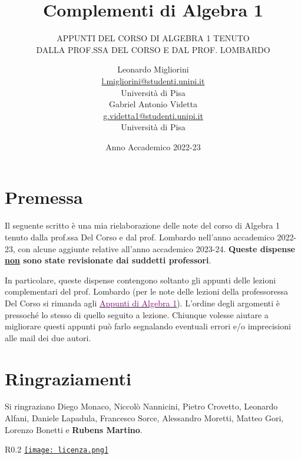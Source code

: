 \documentclass[11pt]{scrartcl}
\begin{document}
	\title{Complementi di Algebra 1}
	\subtitle{\large\normalfont\rmfamily\scshape APPUNTI DEL CORSO DI ALGEBRA 1 TENUTO\\ DALLA PROF.SSA DEL CORSO E DAL PROF. LOMBARDO}
	\author{Leonardo Migliorini \\ \textnormal{\href{l.migliorini@studenti.unipi.it}{l.migliorini@studenti.unipi.it}} \\ Università di Pisa \\[0.3in] Gabriel Antonio Videtta \\ \textnormal{\href{g.videtta1@studenti.unipi.it}{g.videtta1@studenti.unipi.it}} \\ Università di Pisa}
	\date{Anno Accademico 2022-23}
	\maketitle
	\newpage
	
	\tableofcontents
	
	\newpage
	
	\section*{Premessa}
	Il seguente scritto è una mia rielaborazione delle note del corso di Algebra 1 tenuto dalla prof.ssa Del Corso e dal prof. Lombardo nell'anno accademico 
	2022-23, con alcune aggiunte relative all'anno accademico 2023-24. \textbf{Queste dispense \underline{non} sono state revisionate dai suddetti professori}. \medskip
	
	In particolare, queste dispense contengono soltanto gli appunti delle lezioni complementari del prof. Lombardo (per
	le note delle lezioni della professoressa Del Corso si rimanda agli \href{https://github.com/diego-unipi/Algebra-1}{\textcolor{purple}{Appunti di Algebra 1}}). L'ordine degli argomenti è pressoché lo stesso di quello seguito a lezione.
	Chiunque volesse aiutare a migliorare questi appunti può farlo segnalando eventuali errori e/o imprecisioni alle mail dei due autori.
	
	\section*{Ringraziamenti}
	
	Si ringraziano Diego Monaco, Niccolò Nannicini, Pietro Crovetto, Leonardo Alfani,
	Daniele Lapadula, Francesco Sorce, Alessandro Moretti, Matteo Gori, Lorenzo Bonetti e \textbf{Rubens Martino}.
	
	\mbox{}
	\vfill
	\begin{wrapfigure}{R}{0.2\textwidth}
		\centering
		\href{https://creativecommons.org/licenses/by-nc/4.0/deed.it}{\texttt{[image: licenza.png]}}
	\end{wrapfigure}
	
\end{document}
